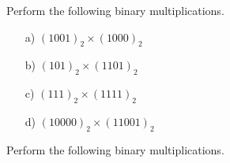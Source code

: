 
	
	\item Perform the following binary multiplications.
	\begin{multicols}{2}
		\begin{itemize}
			\item[a)] $(1001)_{2}\times( 1000)_{2}$  %
			\item[b)] $(101)_{2}\times(1101)_{2}$ %
			\item[c)] $(111)_{2}\times(1111)_{2}$ %
			\item[d)] $(10000)_{2}\times(11001)_{2}$    %
		\end{itemize}
	\end{multicols}
	
	
	
	\item Perform the following binary multiplications.
	
